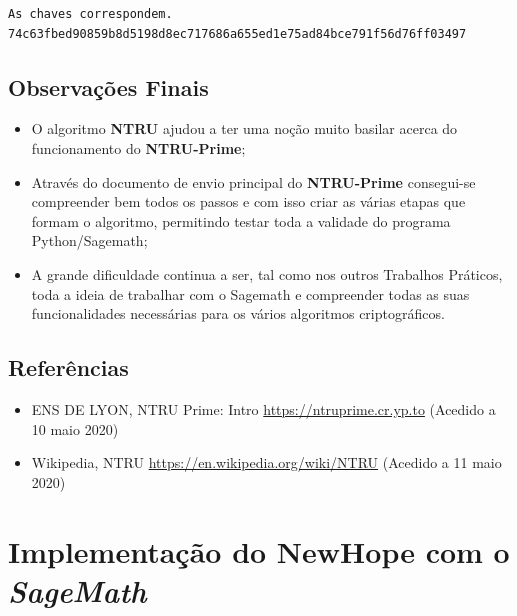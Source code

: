 \documentclass[12pt]{report}
\providecommand{\tightlist}{%
      \setlength{\itemsep}{0pt}\setlength{\parskip}{0pt}}
\begin{document}
    \begin{Verbatim}[commandchars=\\\{\}]
As chaves correspondem.
74c63fbed90859b8d5198d8ec717686a655ed1e75ad84bce791f56d76ff03497

    \end{Verbatim}

    \subsection{Observações Finais}\label{observauxe7uxf5es-finais}
\vspace{2mm}

\begin{itemize}
\tightlist
\item
  O algoritmo \textbf{NTRU} ajudou a ter uma noção muito basilar acerca
  do funcionamento do \textbf{NTRU-Prime};
\item
  Através do documento de envio principal do \textbf{NTRU-Prime}
  consegui-se compreender bem todos os passos e com isso criar as várias
  etapas que formam o algoritmo, permitindo testar toda a validade do
  programa Python/Sagemath;
\item
  A grande dificuldade continua a ser, tal como nos outros Trabalhos
  Práticos, toda a ideia de trabalhar com o Sagemath e compreender todas
  as suas funcionalidades necessárias para os vários algoritmos
  criptográficos.
\end{itemize}
\vspace{2mm}

    \subsection{Referências}\label{referuxeancias}
\vspace{2mm}

\begin{itemize}
\tightlist
\item
  ENS DE LYON, NTRU Prime: Intro \url{https://ntruprime.cr.yp.to} (Acedido a
  10 maio 2020)
\item
  Wikipedia, NTRU \url{https://en.wikipedia.org/wiki/NTRU} (Acedido a 11 maio
  2020)
\end{itemize}
\vspace{5mm}

\newpage
    \section{\texorpdfstring{Implementação do NewHope com o
\emph{SageMath}}{Implementação do NewHope com o SageMath}}\label{implementauxe7uxe3o-do-newhope-com-o-sagemath}
\vspace{3mm}
\end{document}
